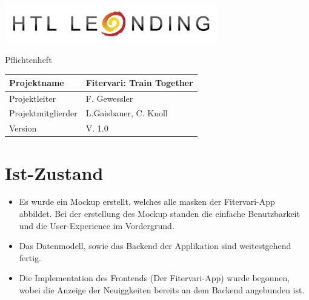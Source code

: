 \documentclass[12pt]{article}
\theoremstyle{definition}
\newcommand{\projektname}{Fitervari: Train Together}
\newcommand{\doctype}{Pflichtenheft}
\newcommand{\projektleiter}{F. Gewessler}
\newcommand{\projektmitglieder}{L.Gaisbauer, C. Knoll}
\newcommand{\version}{V. 1.0}
\begin{document}
\begin{titlepage}
\begin{flushright}
\includegraphics[scale=.5]{htlleondinglogo.png}\\
\end{flushright}

\vspace{10em}

\begin{flushright}

\end{flushright}
\begin{center}
{\LARGE \doctype} \\[3em]
\end{center}
\pagebreak


\begin{flushleft}
\begin{tabular}{|l|l|}
\hline
Projektname & \projektname \\ \hline
Projektleiter & \projektleiter \\ \hline
Projektmitglierder & \projektmitglieder \\ \hline
Version & \version \\ \hline
\end{tabular}
\end{flushleft}

\end{titlepage}

\tableofcontents
\pagebreak

\section{Ist-Zustand}
\begin{itemize}
    \item Es wurde ein Mockup erstellt, welches alle masken der Fitervari-App abbildet. Bei der erstellung des Mockup standen die einfache Benutzbarkeit und die User-Experience im Vordergrund. 
    \item Das Datenmodell, sowie das Backend der Applikation sind weitestgehend fertig.
    \item Die Implementation des Frontends (Der Fitervari-App) wurde begonnen, wobei die Anzeige der Neuiggkeiten bereits an dem Backend angebunden ist.   
\end{itemize}
\end{document}
